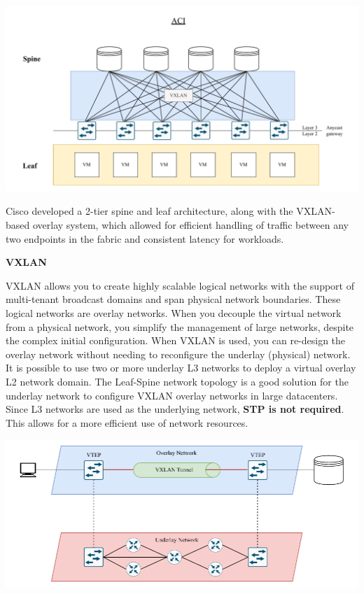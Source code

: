 \begin{center}
    \includegraphics[scale=0.6]{Pics/aci_topology.pdf}
\end{center}

Cisco developed a 2-tier spine and leaf architecture, along with the VXLAN-based overlay system, which allowed for efficient handling of traffic between any two endpoints in the fabric and consistent latency for workloads.

\begin{note}
    \begin{center}
        \textbf{VXLAN}
    \end{center}
    VXLAN allows you to create highly scalable logical networks with the support of multi-tenant broadcast domains and span physical network boundaries. These logical networks are overlay networks. When you decouple the virtual network from a physical network, you simplify the management of large networks, despite the complex initial configuration. When VXLAN is used, you can re-design the overlay network without needing to reconfigure the underlay (physical) network. It is possible to use two or more underlay L3 networks to deploy a virtual overlay L2 network domain. The Leaf-Spine network topology is a good solution for the underlay network to configure VXLAN overlay networks in large datacenters. Since L3 networks are used as the underlying network, \textbf{STP is not required}. This allows for a more efficient use of network resources.

   \begin{center}
    \includegraphics[scale=0.6]{Pics/vxlan.pdf}
   \end{center} 
\end{note}